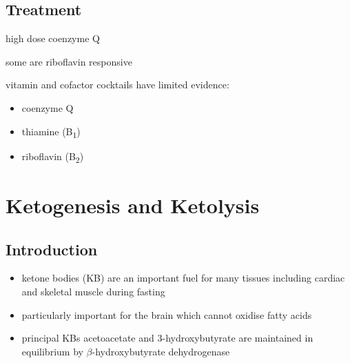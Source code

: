 \documentclass[12pt]{scrartcl}
\begin{document}
\subsection{Treatment}
\label{sec:orgfd448c0}
\begin{description}
\item[{Coenzyme Q disorders}] high dose coenzyme Q
\item[{CI deficiency}] some are riboflavin responsive
\item vitamin and cofactor cocktails have limited evidence:
\begin{itemize}
\item coenzyme Q
\item thiamine (B\textsubscript{1})
\item riboflavin (B\textsubscript{2})
\end{itemize}
\end{description}
\section{Ketogenesis and Ketolysis}
\label{sec:org461a38f}
\subsection{Introduction}
\label{sec:org7cf8b27}
\begin{itemize}
\item ketone bodies (KB) are an important fuel for many tissues including
cardiac and skeletal muscle during fasting
\item particularly important for the brain which cannot oxidise fatty
acids
\item principal KBs acetoacetate and 3-hydroxybutyrate are maintained in
equilibrium by \(\beta\)-hydroxybutyrate dehydrogenase

\end{itemize}

\begin{center}
\chemnameinit{}
\hspace{20}
\chemnameinit{}
\hspace{20}
\chemnameinit{}
\end{center}
\end{document}
